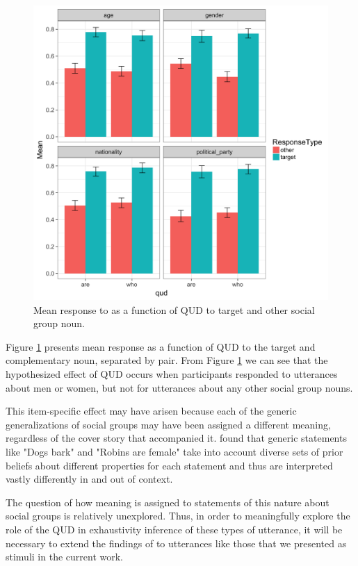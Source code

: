 \documentclass[11pt,a4paper]{article}
\begin{document}
\begin{figure}[h]
\includegraphics[width=\linewidth]{qud_means_nounclass.png}
\caption{Mean response to as a function of QUD to target and other social group noun.}
\label{nounclass}
\end{figure}

Figure \ref{nounclass} presents mean response as a function of QUD to the target and complementary noun, separated by pair. From Figure \ref{nounclass} we can see that the hypothesized effect of QUD occurs when participants responded to utterances about men or women, but not for utterances about any other social group nouns. 

This item-specific effect may have arisen because each of the generic generalizations of social groups may have been assigned a different meaning, regardless of the cover story that accompanied it. \cite{tessler-goodman} found that generic statements like "Dogs bark" and "Robins are female" take into account diverse sets of prior beliefs about different properties for each statement and thus are interpreted vastly differently in and out of context. 

The question of how meaning is assigned to statements of this nature about social groups is relatively unexplored. Thus, in order to meaningfully explore the role of the QUD in exhaustivity inference of these types of utterance, it will be necessary to extend the findings of \cite{tessler-goodman} to utterances like those that we presented as stimuli in the current work.
\end{document}
